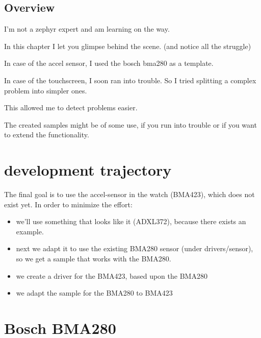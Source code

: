 \documentclass[letterpaper,10pt,english]{sphinxmanual}
\begin{document}
\subsection{Overview}
\label{\detokenize{behind/behind-the-scene:overview}}
I’m not a zephyr expert and am learning on the way.

In this chapter I let you glimpse behind the scene. (and notice all the struggle)

In case of the accel sensor, I used the bosch bma280 as a template.

In case of the touchscreen, I soon ran into trouble.
So I tried splitting a complex problem into simpler ones.

This allowed me to detect problems easier.

The created samples might be of some use, if you run into trouble or if you want to extend the functionality.


\section{development trajectory}
\label{\detokenize{behind/bma280:development-trajectory}}\label{\detokenize{behind/bma280::doc}}
The final goal is to use the accel-sensor in the watch (BMA423), which does not exist yet.
In order to minimize the effort:
\begin{itemize}
\item {} 
we’ll use something that looks like it (ADXL372), because there exists an example.

\item {} 
next we adapt it to use the existing BMA280 sensor (under drivers/sensor), so we get a sample that works with the BMA280.

\item {} 
we create a driver for the BMA423, based upon the BMA280

\item {} 
we adapt the sample for the BMA280 to BMA423

\end{itemize}


\section{Bosch BMA280}
\label{\detokenize{behind/bma280:bosch-bma280}}
\begin{sphinxVerbatim}[commandchars=\\\{\}]
\end{sphinxVerbatim}
\end{document}
